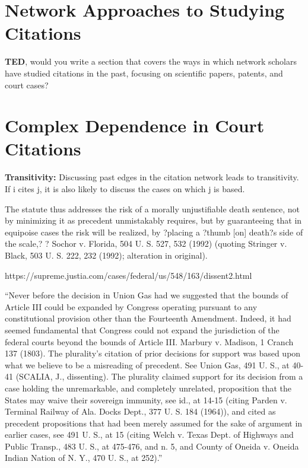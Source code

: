 \documentclass[headsepline=true, abstracton]{scrartcl}
\begin{document}
\section{Network Approaches to Studying Citations}

\textbf{TED}, would you write a section that covers the ways in which network scholars have studied citations in the past, focusing on scientific papers, patents, and court cases? 


\section{Complex Dependence in Court Citations}

\textbf{Transitivity:} Discussing past edges in the citation network leads to transitivity. If i cites j, it is also likely to discuss the cases on which j is based.

The statute thus addresses the risk of a morally unjustifiable death sentence, not by minimizing it as precedent unmistakably requires, but by guaranteeing that in equipoise cases the risk will be realized, by ?placing a ?thumb [on] death?s side of the scale,? ? Sochor v. Florida, 504 U. S. 527, 532 (1992) (quoting Stringer v. Black, 503 U. S. 222, 232 (1992); alteration in original).

https://supreme.justia.com/cases/federal/us/548/163/dissent2.html


``Never before the decision in Union Gas had we suggested that the bounds of Article III could be expanded by Congress operating pursuant to any constitutional provision other than the Fourteenth Amendment. Indeed, it had seemed fundamental that Congress could not expand the jurisdiction of the federal courts beyond the bounds of Article III. Marbury v. Madison, 1 Cranch 137 (1803). The plurality's citation of prior decisions for support was based upon what we believe to be a misreading of precedent. See Union Gas, 491 U. S., at 40-41 (SCALIA, J., dissenting). The plurality claimed support for its decision from a case holding the unremarkable, and completely unrelated, proposition that the States may waive their sovereign immunity, see id., at 14-15 (citing Parden v. Terminal Railway of Ala. Docks Dept., 377 U. S. 184 (1964)), and cited as precedent propositions that had been merely assumed for the sake of argument in earlier cases, see 491 U. S., at 15 (citing Welch v. Texas Dept. of Highways and Public Transp., 483 U. S., at 475-476, and n. 5, and County of Oneida v. Oneida Indian Nation of N. Y., 470 U. S., at 252).''
\end{document}
